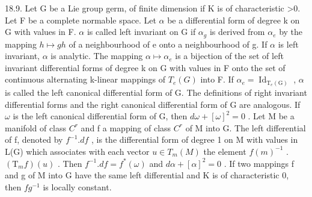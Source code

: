 18.9. Let G be a Lie group germ, of finite dimension if K is of characteristic \textgreater0. Let F be a complete normable space. Let \(\alpha\) be a differential form of degree k on G with values in F. \(\alpha\) is called left invariant on G if \(\alpha_{g}\) is derived from \(\alpha_{e}\) by the mapping \(h \mapsto gh\) of a neighbourhood of e onto a neighbourhood of g. If \(\alpha\) is left invariant, \(\alpha\) is analytic. The mapping \(\alpha \mapsto \alpha_{e}\) is a bijection of the set of left invariant differential forms of degree k on G with values in F onto the set of continuous alternating k-linear mappings of \(T_{e}(G)\) into F. If \(\alpha_{e} = \operatorname{Id}_{\mathrm{T}_e(\mathrm{G})}\) , \(\alpha\) is called the left canonical differential form of G. The definitions of right invariant differential forms and the right canonical differential form of G are analogous. If \(\omega\) is the left canonical differential form of G, then \(d\omega + [\omega]^{2} = 0\) . Let M be a manifold of class \(C^{r}\) and f a mapping of class \(C^{r}\) of M into G. The left differential of f, denoted by \(f^{-1}.df\) , is the differential form of degree 1 on M with values in L(G) which associates with each vector \(u \in T_{m}(M)\) the element \(f(m)^{-1}\) . \((\mathrm{T}_{m}f)(u)\) . Then \(f^{-1}.df = f^{*}(\omega)\) and \(d\alpha + [\alpha]^{2} = 0\) . If two mappings f and g of M into G have the same left differential and K is of characteristic 0, then \(fg^{-1}\) is locally constant.

